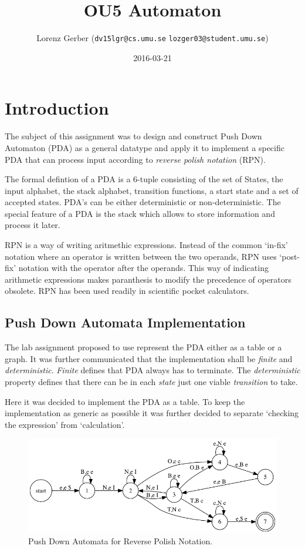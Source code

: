 \documentclass[a4paper,11pt,twoside]{article}
\title{OU5 Automaton}
\author{Lorenz Gerber ({\tt{dv15lgr@cs.umu.se}} {\tt{lozger03@student.umu.se}})}
\date{2016-03-21}
\begin{document}
\lstset{language=C}
\maketitle
\thispagestyle{empty}
\newpage
\tableofcontents
\thispagestyle{empty}
\newpage

\clearpage
{}

\section{Introduction} 
The subject of this assignment was to design and construct Push Down
Automaton (PDA) as a general datatype and apply it to implement a
specific PDA that can process input according to \textit{reverse
  polish notation} (RPN).

The formal defintion of a PDA is a 6-tuple consisting of the set of
States, the input alphabet, the stack alphabet, transition functions,
a start state and a set of accepted states. PDA's can be either
deterministic or non-deterministic. The special feature of a PDA is
the stack which allows to store information and process it later. 

RPN is a way of writing aritmethic expressions. Instead of the common
`in-fix' notation where an operator is written between the two
operands, RPN uses `post-fix' notation with the operator after the
operands. This way of indicating arithmetic expressions makes
paranthesis to modify the precedence of operators obsolete. RPN has
been used readily in scientific pocket calculators. 

\subsection{Push Down Automata Implementation}
The lab assignment proposed to use represent the PDA either as a table or
a graph. It was further communicated that the implementation shall be
\textit{finite} and \textit{deterministic}. \textit{Finite} defines that PDA
always has to terminate. The \textit{deterministic} property defines
that there can be in each \textit{state} just one viable
\textit{transition} to take.  

Here it was decided to implement the PDA as a table. To keep the
implementation as generic as possible it was further decided to
separate `checking the expression' from `calculation'. 

\begin{figure}
 \centering
  \includegraphics[width=\textwidth]{pda}
  \caption{Push Down Automata for Reverse Polish Notation.}
\end{figure}
\end{document}
